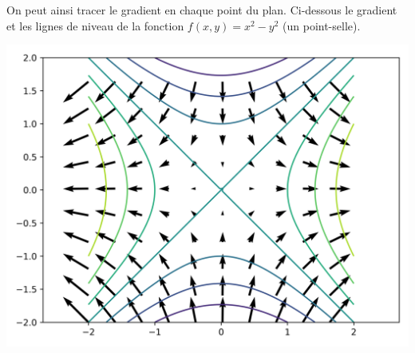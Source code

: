 \documentclass[11pt,class=report,crop=false]{standalone}
\begin{document}
On peut ainsi tracer le gradient en chaque point du plan. Ci-dessous le gradient et les lignes de niveau de la fonction $f(x,y) = x^2-y^2$ (un point-selle).
\begin{center}
\includegraphics[scale=\myscale,scale=0.8]{figures/tenseur-gradient}
\end{center}
\end{document}
